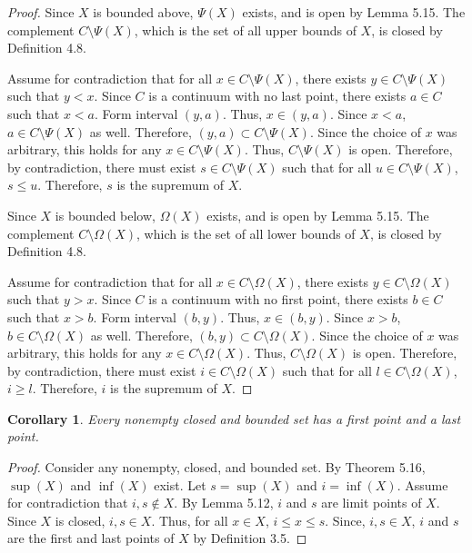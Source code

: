 \documentclass{amsart}
\newtheorem{corollary}[theorem]{Corollary}
\newcommand{\1}{\mathds{1}}
\numberwithin{equation}{section}
\numberwithin{theorem}{section}
\begin{document}
\begin{proof}
	Since $X$ is bounded above, $\Psi(X)$ exists, and is open by Lemma 5.15. The complement $C\setminus \Psi(X)$, which is the set of all upper bounds of $X$, is closed by 
	Definition 4.8. 
	
	Assume for contradiction that for all $x\in C\setminus \Psi(X)$, there exists $y\in C\setminus \Psi(X)$ such that $y<x$. Since $C$ is a continuum with no last point, there exists $a\in C$ such that $x<a$. Form interval $(y,a)$. Thus, $x\in (y,a)$. Since $x<a$, $a\in C\setminus \Psi(X)$ as well. Therefore, $(y,a)\subset C\setminus \Psi(X)$. Since the choice of $x$ was arbitrary, this holds for any $x\in C\setminus \Psi(X)$. Thus,  $C\setminus \Psi(X)$ is open. Therefore, by contradiction, there must exist $s\in C\setminus \Psi(X)$ such that for all $u\in C\setminus \Psi(X)$, $s\le u$. Therefore, $s$ is the supremum of $X$.
	
	Since $X$ is bounded below, $\Omega(X)$ exists, and is open by Lemma 5.15. The complement $C\setminus \Omega(X)$, which is the set of all lower bounds of $X$, is closed by Definition 4.8. 
	
	Assume for contradiction that for all $x\in C\setminus \Omega(X)$, there exists $y\in C\setminus \Omega(X)$ such that $y>x$. Since $C$ is a continuum with no first point, there exists $b\in C$ such that $x>b$. Form interval $(b,y)$. Thus, $x\in (b,y)$. Since $x>b$, $b\in C\setminus \Omega(X)$ as well. Therefore, $(b,y)\subset C\setminus \Omega(X)$. Since the choice of $x$ was arbitrary, this holds for any $x\in C\setminus \Omega(X)$. Thus,  $C\setminus \Omega(X)$ is open. Therefore, by contradiction, there must exist $i\in C\setminus \Omega(X)$ such that for all $l\in C\setminus \Omega(X)$, $i\ge l$. Therefore, $i$ is the supremum of $X$.
\end{proof}

\begin{corollary}  Every nonempty closed and bounded set has a first point and a last point.
\end{corollary}

\begin{proof}
	Consider any nonempty, closed, and bounded set. By Theorem 5.16, $\sup (X)$ and $\inf (X)$ exist. Let $s = \sup (X)$ and $i = \inf (X)$.  Assume for contradiction that $i,s\notin X$. By Lemma 5.12, $i$ and $s$ are limit points of $X$. Since $X$ is closed,  $i,s\in X$. Thus, for all $x\in X$, $i \le x \le s$. Since, $i,s\in X$, $i$ and $s$ are the first and last points of $X$ by Definition 3.5.
	

\end{proof}
\end{document}
